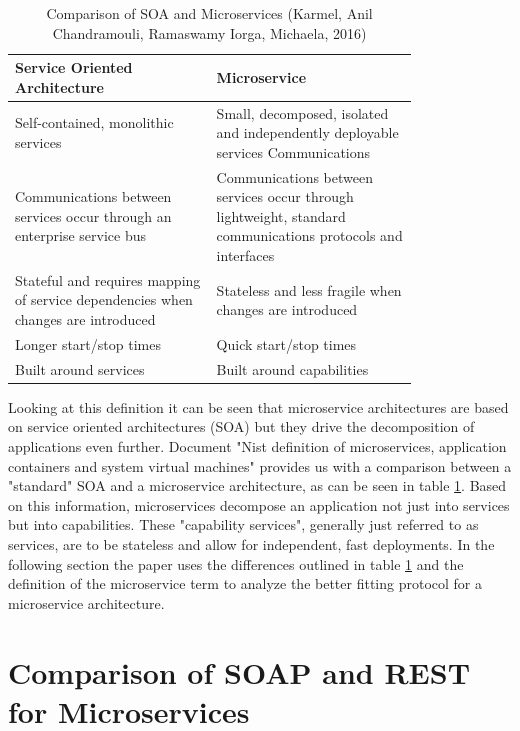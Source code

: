 \documentclass[conference]{IEEEtran}
\begin{document}
\begin{table}[!htbp]
	\centering
	\caption{Comparison of SOA and Microservices (Karmel, Anil
		Chandramouli, Ramaswamy
		Iorga, Michaela, 2016)}
	\label{micro:comparison}
	\begin{tabular}{| p{0.4\linewidth} | p{0.4\linewidth}|}\hline
		Service Oriented Architecture & Microservice \\\hline
	Self-contained, monolithic services & Small, decomposed, isolated and independently deployable services Communications\\\hline
		Communications between services occur through an enterprise service bus & Communications between services occur through lightweight, standard communications protocols and interfaces\\\hline
		Stateful and requires mapping of service dependencies when changes are introduced & Stateless and less fragile when changes are introduced\\\hline
		Longer start/stop times & Quick start/stop times\\\hline
		Built around services & Built around capabilities\\\hline
	\end{tabular}
\end{table}

Looking at this definition it can be seen that microservice architectures are based on service oriented architectures (SOA) but they drive the decomposition of applications even further. Document "Nist definition of microservices, application containers and system virtual machines" \cite{karmel2016nist} provides us with a comparison between a "standard" SOA and a microservice architecture, as can be seen in table \ref{micro:comparison}. Based on this information, microservices decompose an application not just into services but into capabilities. These "capability services", generally just referred to as services, are to be stateless and allow for independent, fast deployments. In the following section the paper uses the differences outlined in table \ref{micro:comparison} and the definition of the microservice term to analyze the better fitting protocol for a microservice architecture.

\section{Comparison of SOAP and REST for Microservices}
\label{sec:comp}
\end{document}
